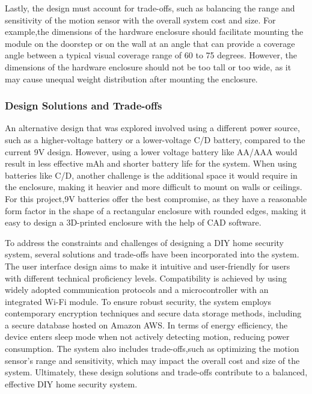 Lastly, the design must account for trade-offs, such as balancing the range and sensitivity of
the motion sensor with the overall system cost and size. For example,the dimensions of the
hardware enclosure should facilitate mounting the module on the doorstep or on the wall at an
angle that can provide a coverage angle between a typical visual coverage range of 60 to 75
degrees. However, the dimensions of the hardware enclosure should not be too tall or too wide,
as it may cause unequal weight distribution after mounting the enclosure.

\subsubsection{Design Solutions and Trade-offs}

An alternative design that was explored involved using a different power source, such as a
higher-voltage battery or a lower-voltage C/D battery, compared to the current 9V design.
However, using a lower voltage battery like AA/AAA would result in less effective mAh and
shorter battery life for the system. When using batteries like C/D, another challenge is the
additional space it would require in the enclosure, making it heavier and more difficult to
mount on walls or ceilings. For this project,9V batteries offer the best compromise, as they
have a reasonable form factor in the shape of a rectangular enclosure with rounded edges,
making it easy to design a 3D-printed enclosure with the help of CAD software.

To address the constraints and challenges of designing a DIY home security system, several
solutions and trade-offs have been incorporated into the system. The user interface design
aims to make it intuitive and user-friendly for users with different technical proficiency
levels. Compatibility is achieved by using widely adopted communication protocols and a
microcontroller with an integrated Wi-Fi module. To ensure robust security, the system employs
contemporary encryption techniques and secure data storage methods, including a secure
database hosted on Amazon AWS. In terms of energy efficiency, the device enters sleep mode
when not actively detecting motion, reducing power consumption. The system also includes
trade-offs,such as optimizing the motion sensor's range and sensitivity, which may impact the
overall cost and size of the system. Ultimately, these design solutions and trade-offs
contribute to a balanced, effective DIY home security system.
